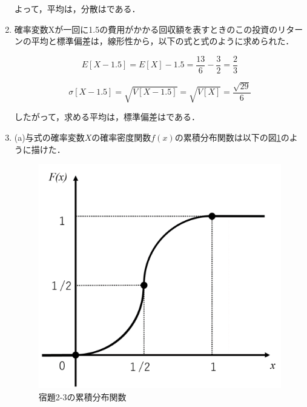 \documentclass[a4paper,10pt]{jarticle}
\begin{document}
\begin{enumerate}
	よって，平均は，分散はである．
		\vspace{3mm}

	 \item 確率変数Xが一回に1.5の費用がかかる回収額を表すときのこの投資のリターンの平均と標準偏差は，線形性から，以下の式と式のように求められた．

	 \begin{equation}
		\label{equ5}
		E[X-1.5] = E[X] - 1.5 = \frac{13}{6} - \frac{3}{2} = \frac{2}{3}
	 \end{equation}
	 
	 \begin{equation}
		\label{equ6}
		\sigma[X-1.5] = \sqrt{V[X-1.5]} = \sqrt{V[X]} = \frac{\sqrt{29}}{6}
	 \end{equation}

	 したがって，求める平均は，標準偏差はである．

	 \vspace{3mm}

	 \item (a)与式の確率変数$X$の確率密度関数$f(x)$の累積分布関数は以下の図\ref*{apara2}のように描けた．
	 
	 \begin{figure}[H]
		\begin{center}
		 \includegraphics[scale=1.0]{zu5.png}
		 \caption{宿題2-3の累積分布関数}
		 \label{apara2}
		\end{center}
		\end{figure}


\end{enumerate}
\end{document}
